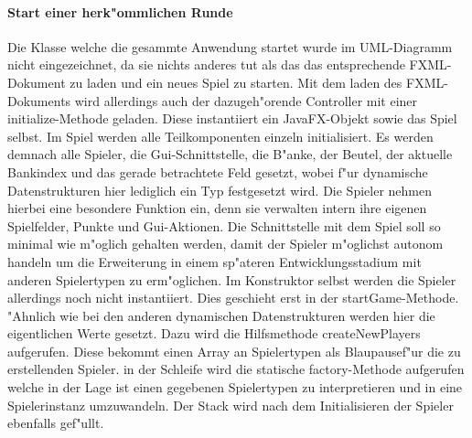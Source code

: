 \paragraph{Start einer herk"ommlichen Runde}
Die Klasse welche die gesammte Anwendung startet wurde im UML-Diagramm nicht eingezeichnet, da sie nichts anderes tut als das das entsprechende FXML-Dokument zu laden und ein neues Spiel zu starten. Mit dem laden des FXML-Dokuments wird allerdings auch der dazugeh"orende Controller mit einer initialize-Methode geladen. Diese instantiiert ein JavaFX-Objekt sowie das Spiel selbst. Im Spiel werden alle Teilkomponenten einzeln initialisiert. Es werden demnach alle Spieler, die Gui-Schnittstelle, die B"anke, der Beutel, der aktuelle Bankindex und das gerade betrachtete Feld gesetzt, wobei f"ur dynamische Datenstrukturen hier lediglich ein Typ festgesetzt wird. Die Spieler nehmen hierbei eine besondere Funktion ein, denn sie verwalten intern ihre eigenen Spielfelder, Punkte und Gui-Aktionen. Die Schnittstelle mit dem Spiel soll so minimal wie m"oglich gehalten werden, damit der Spieler m"oglichst autonom handeln um die Erweiterung in einem sp"ateren Entwicklungsstadium mit anderen Spielertypen zu erm"oglichen. Im Konstruktor selbst werden die Spieler allerdings noch nicht instantiiert. Dies geschieht erst in der startGame-Methode. "Ahnlich wie bei den anderen dynamischen Datenstrukturen werden hier die eigentlichen Werte gesetzt. Dazu wird die Hilfsmethode createNewPlayers aufgerufen. Diese bekommt einen Array an Spielertypen als \glqq Blaupause\grqq  f"ur die zu erstellenden Spieler. in der Schleife wird die statische factory-Methode aufgerufen welche in der Lage ist einen gegebenen Spielertypen zu interpretieren und in eine Spielerinstanz umzuwandeln. Der Stack wird nach dem Initialisieren der Spieler ebenfalls gef"ullt. 

